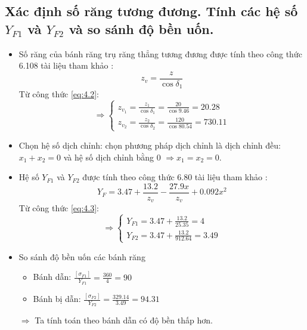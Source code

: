         \subsection{Xác định số răng tương đương. Tính các hệ số $Y_{F1}$ và $Y_{F2}$ và so sánh độ bền uốn.}
            \begin{itemize}
                \item Số răng của bánh răng trụ răng thẳng tương đương được tính theo công thức 6.108 tài liệu tham khảo \cite{gtctm}:
                    \begin{equation}
                        z_{v} = \frac{z}{\cos{\delta_1}}
                        \label{eq:4.2}
                    \end{equation}
                    Từ công thức \ref{eq:4.2}:
                    \[
                    \Rightarrow
                    \begin{cases}
                        z_{v_1} = \frac{z_1}{\cos{\delta_1}} = \frac{20}{\cos{9.46}} = 20.28\\
                        z_{v_2} = \frac{z_2}{\cos{\delta_2}} = \frac{120}{\cos{80.54}} = 730.11
                    \end{cases}
                    \] 
                \item Chọn hệ số dịch chỉnh: chọn phương pháp dịch chỉnh là dịch chỉnh đều: $x_1 + x_2 = 0$ và hệ số dịch chỉnh bằng 0 $\Rightarrow x_1 = x_2 = 0$.      
                \item Hệ số $Y_{F1}$ và $Y_{F2}$ được tính theo công thức 6.80 tài liệu tham khảo \cite{gtctm}:                    
                    \begin{equation}
                        Y_{F} = 3.47 + \frac{13.2}{z_{v}} - \frac{27.9x}{z_{v}} + 0.092x^2
                        \label{eq:4.3}
                    \end{equation}
                    Từ công thức \ref{eq:4.3}:
                    \[
                    \Rightarrow
                    \begin{cases}
                        Y_{F1} = 3.47 + \frac{13.2}{25.35} = 4 \\
                        Y_{F2} = 3.47 + \frac{13.2}{912.64} = 3.49 
                    \end{cases}
                    \] 
                \item{So sánh độ bền uốn các bánh răng}
                    \begin{itemize}
                        \item Bánh dẫn: $\frac{[\sigma_{F1}]}{Y_{F1}} = \frac{360}{4} = 90$
                        \item Bánh bị dẫn: $\frac{[\sigma_{F2}]}{Y_{F2}} =\frac{329.14}{3.49} = 94.31$
                    \end{itemize}
                    $\Rightarrow$ Ta tính toán theo bánh dẫn có độ bền thấp hơn.
            \end{itemize}
